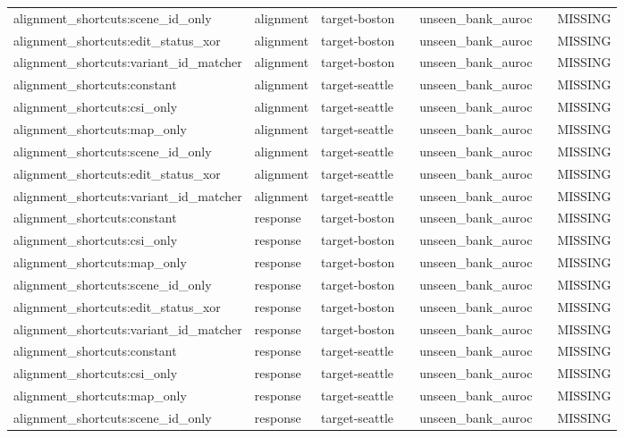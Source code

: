 \begin{longtable}{lllllll}
alignment\_shortcuts:scene\_id\_only & alignment & target-boston &  & unseen\_bank\_auroc &  & MISSING \\
alignment\_shortcuts:edit\_status\_xor & alignment & target-boston &  & unseen\_bank\_auroc &  & MISSING \\
alignment\_shortcuts:variant\_id\_matcher & alignment & target-boston &  & unseen\_bank\_auroc &  & MISSING \\
alignment\_shortcuts:constant & alignment & target-seattle &  & unseen\_bank\_auroc &  & MISSING \\
alignment\_shortcuts:csi\_only & alignment & target-seattle &  & unseen\_bank\_auroc &  & MISSING \\
alignment\_shortcuts:map\_only & alignment & target-seattle &  & unseen\_bank\_auroc &  & MISSING \\
alignment\_shortcuts:scene\_id\_only & alignment & target-seattle &  & unseen\_bank\_auroc &  & MISSING \\
alignment\_shortcuts:edit\_status\_xor & alignment & target-seattle &  & unseen\_bank\_auroc &  & MISSING \\
alignment\_shortcuts:variant\_id\_matcher & alignment & target-seattle &  & unseen\_bank\_auroc &  & MISSING \\
alignment\_shortcuts:constant & response & target-boston &  & unseen\_bank\_auroc &  & MISSING \\
alignment\_shortcuts:csi\_only & response & target-boston &  & unseen\_bank\_auroc &  & MISSING \\
alignment\_shortcuts:map\_only & response & target-boston &  & unseen\_bank\_auroc &  & MISSING \\
alignment\_shortcuts:scene\_id\_only & response & target-boston &  & unseen\_bank\_auroc &  & MISSING \\
alignment\_shortcuts:edit\_status\_xor & response & target-boston &  & unseen\_bank\_auroc &  & MISSING \\
alignment\_shortcuts:variant\_id\_matcher & response & target-boston &  & unseen\_bank\_auroc &  & MISSING \\
alignment\_shortcuts:constant & response & target-seattle &  & unseen\_bank\_auroc &  & MISSING \\
alignment\_shortcuts:csi\_only & response & target-seattle &  & unseen\_bank\_auroc &  & MISSING \\
alignment\_shortcuts:map\_only & response & target-seattle &  & unseen\_bank\_auroc &  & MISSING \\
alignment\_shortcuts:scene\_id\_only & response & target-seattle &  & unseen\_bank\_auroc &  & MISSING \\

\end{longtable}
